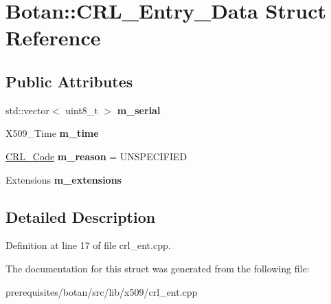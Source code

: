 \hypertarget{struct_botan_1_1_c_r_l___entry___data}{}\section{Botan\+:\+:C\+R\+L\+\_\+\+Entry\+\_\+\+Data Struct Reference}
\label{struct_botan_1_1_c_r_l___entry___data}
\subsection*{Public Attributes}
\begin{DoxyCompactItemize}
\item 
\mbox{\label{struct_botan_1_1_c_r_l___entry___data_ad94cd2f006827fd0b290f11f63ae87e4}} 
std\+::vector$<$ uint8\+\_\+t $>$ {\bfseries m\+\_\+serial}
\item 
\mbox{\label{struct_botan_1_1_c_r_l___entry___data_ad3cd7ec21b26aeda548bfc4864157792}} 
X509\+\_\+\+Time {\bfseries m\+\_\+time}
\item 
\mbox{\label{struct_botan_1_1_c_r_l___entry___data_ac88db4ca3cd642bb78a349d160bceec8}} 
\mbox{\hyperlink{namespace_botan_a557e654e0c387a4ef2521e3ece516ca7}{C\+R\+L\+\_\+\+Code}} {\bfseries m\+\_\+reason} = U\+N\+S\+P\+E\+C\+I\+F\+I\+ED
\item 
\mbox{\label{struct_botan_1_1_c_r_l___entry___data_a5d1a0542da30efc8b773d5c30f820b3a}} 
Extensions {\bfseries m\+\_\+extensions}
\end{DoxyCompactItemize}


\subsection{Detailed Description}


Definition at line 17 of file crl\+\_\+ent.\+cpp.



The documentation for this struct was generated from the following file\+:\begin{DoxyCompactItemize}
\item 
prerequisites/botan/src/lib/x509/crl\+\_\+ent.\+cpp\end{DoxyCompactItemize}
